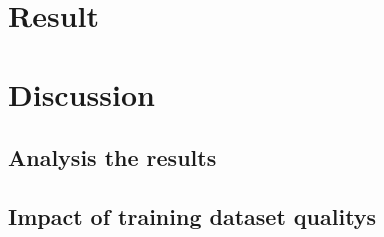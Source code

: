 \documentclass[12pt]{article}
\begin{document}
\section{Result}

\section{Discussion}

\subsection{Analysis the results}

\subsection{Impact of training dataset qualitys}


\printbibliography
\end{document}
